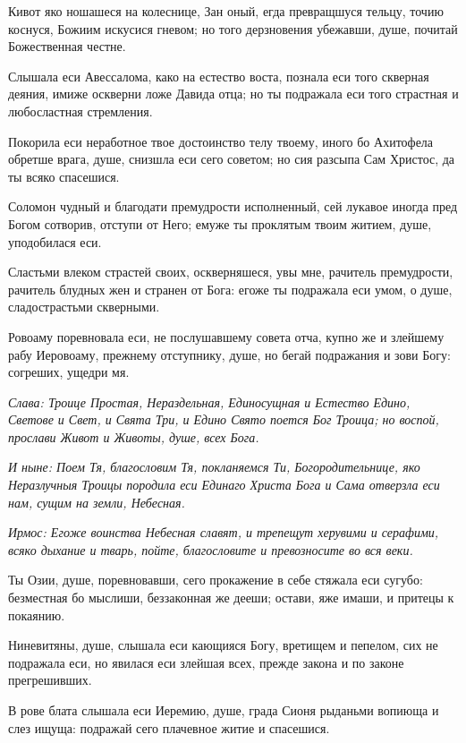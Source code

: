 Кивот яко ношашеся на колеснице, Зан оный, егда превращшуся тельцу, точию коснуся, Божиим искусися гневом; но того дерзновения убежавши, душе, почитай Божественная честне. 

Слышала еси Авессалома, како на естество воста, познала еси того скверная деяния, имиже оскверни ложе Давида отца; но ты подражала еси того страстная и любосластная стремления. 

Покорила еси неработное твое достоинство телу твоему, иного бо Ахитофела обретше врага, душе, снизшла еси сего советом; но сия разсыпа Сам Христос, да ты всяко спасешися. 

Соломон чудный и благодати премудрости исполненный, сей лукавое иногда пред Богом сотворив, отступи от Него; емуже ты проклятым твоим житием, душе, уподобилася еси. 

Сластьми влеком страстей своих, оскверняшеся, увы мне, рачитель премудрости, рачитель блудных жен и странен от Бога: егоже ты подражала еси умом, о душе, сладострастьми скверными. 

Ровоаму поревновала еси, не послушавшему совета отча, купно же и злейшему рабу Иеровоаму, прежнему отступнику, душе, но бегай подражания и зови Богу: согреших, ущедри мя. 

\itshape Слава\normalfont{}: Троице Простая, Нераздельная, Единосущная и Естество Едино, Светове и Свет, и Свята Три, и Едино Свято поется Бог Троица; но воспой, прослави Живот и Животы, душе, всех Бога. 

\itshape И ныне\normalfont{}: Поем Тя, благословим Тя, покланяемся Ти, Богородительнице, яко Неразлучныя Троицы породила еси Единаго Христа Бога и Сама отверзла еси нам, сущим на земли, Небесная. 


\itshape Ирмос\normalfont{}: Егоже воинства Небесная славят, и трепещут херувими и серафими, всяко дыхание и тварь, пойте, благословите и превозносите во вся веки. 

Ты Озии, душе, поревновавши, сего прокажение в себе стяжала еси сугубо: безместная бо мыслиши, беззаконная же дееши; остави, яже имаши, и притецы к покаянию. 

Ниневитяны, душе, слышала еси кающияся Богу, вретищем и пепелом, сих не подражала еси, но явилася еси злейшая всех, прежде закона и по законе прегрешивших. 

В рове блата слышала еси Иеремию, душе, града Сионя рыданьми вопиюща и слез ищуща: подражай сего плачевное житие и спасешися. 

